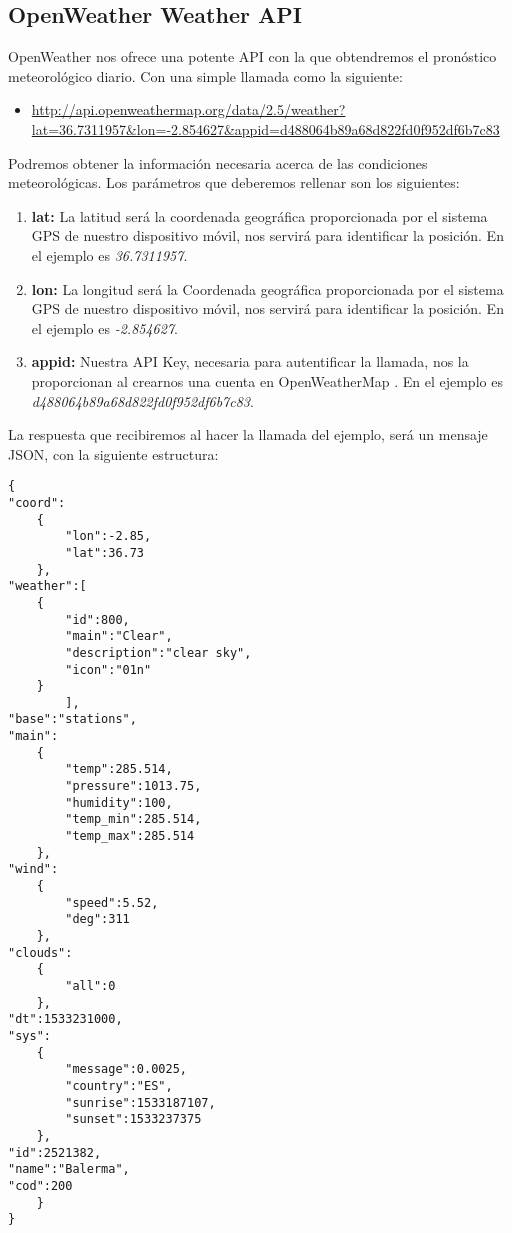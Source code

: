 \subsection{OpenWeather Weather API}

OpenWeather nos ofrece una potente API con la que obtendremos el pronóstico meteorológico diario. Con una simple llamada como la siguiente:
\begin{itemize}


\item  \url{http://api.openweathermap.org/data/2.5/weather?lat=36.7311957&lon=-2.854627&appid=d488064b89a68d822fd0f952df6b7c83}
\end{itemize}
Podremos obtener la información necesaria acerca de las condiciones meteorológicas. Los parámetros que deberemos rellenar son los siguientes:

\begin{enumerate}
\item \textbf{lat:} La latitud será la coordenada geográfica proporcionada por el sistema GPS de nuestro dispositivo móvil, nos servirá para identificar la posición. En el ejemplo es \emph{36.7311957}.
\item \textbf{lon:} La longitud será la Coordenada geográfica proporcionada por el sistema GPS de nuestro dispositivo móvil, nos servirá para identificar la posición. En el ejemplo es \emph{-2.854627}.
\item \textbf{appid:} Nuestra API Key, necesaria para autentificar la llamada, nos la proporcionan al crearnos una cuenta en OpenWeatherMap \cite{OPENWEATHER}. En el ejemplo es \emph{d488064b89a68d822fd0f952df6b7c83}.
\end{enumerate}

La respuesta que recibiremos al hacer la llamada del ejemplo, será un mensaje JSON, con la siguiente estructura:
\\
\begin{lstlisting}
{
"coord":
	{
		"lon":-2.85,
		"lat":36.73
	},
"weather":[
	{
		"id":800,
		"main":"Clear",
		"description":"clear sky",
		"icon":"01n"
	}
		],
"base":"stations",
"main":
	{
		"temp":285.514,
		"pressure":1013.75,
		"humidity":100,
		"temp_min":285.514,
		"temp_max":285.514
	},
"wind":
	{
		"speed":5.52,
		"deg":311
	},
"clouds":
	{
		"all":0
	},
"dt":1533231000,
"sys":
	{
		"message":0.0025,
		"country":"ES",
		"sunrise":1533187107,
		"sunset":1533237375
	},
"id":2521382,
"name":"Balerma",
"cod":200
	}
}
\end{lstlisting}

